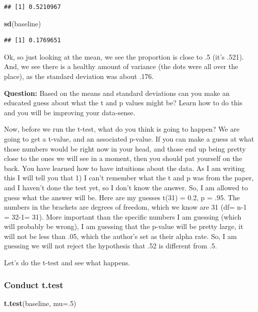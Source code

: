 \documentclass[]{book}
\newenvironment{Shaded}{\begin{snugshade}}{\end{snugshade}}
\newcommand{\KeywordTok}[1]{\textcolor[rgb]{0.13,0.29,0.53}{\textbf{{#1}}}}
\newcommand{\DataTypeTok}[1]{\textcolor[rgb]{0.13,0.29,0.53}{{#1}}}
\newcommand{\DecValTok}[1]{\textcolor[rgb]{0.00,0.00,0.81}{{#1}}}
\newcommand{\NormalTok}[1]{{#1}}
\theoremstyle{definition}
\theoremstyle{definition}
\theoremstyle{definition}
\theoremstyle{remark}
\begin{document}
\begin{verbatim}
## [1] 0.5210967
\end{verbatim}

\begin{Shaded}
\begin{Highlighting}[]
\KeywordTok{sd}\NormalTok{(baseline)}
\end{Highlighting}
\end{Shaded}

\begin{verbatim}
## [1] 0.1769651
\end{verbatim}

Ok, so just looking at the mean, we see the proportion is close to .5
(it's .521). And, we see there is a healthy amount of variance (the dots
were all over the place), as the standard deviation was about .176.

\textbf{Question:} Based on the means and standard deviations can you
make an educated guess about what the t and p values might be? Learn how
to do this and you will be improving your data-sense.

Now, before we run the t-test, what do you think is going to happen? We
are going to get a t-value, and an associated p-value. If you can make a
guess at what those numbers would be right now in your head, and those
end up being pretty close to the ones we will see in a moment, then you
should pat yourself on the back. You have learned how to have intuitions
about the data. As I am writing this I will tell you that 1) I can't
remember what the t and p was from the paper, and I haven't done the
test yet, so I don't know the answer. So, I am allowed to guess what the
answer will be. Here are my guesses t(31) = 0.2, p = .95. The numbers in
the brackets are degrees of freedom, which we know are 31 (df= n-1 =
32-1= 31). More important than the specific numbers I am guessing (which
will probably be wrong), I am guessing that the p-value will be pretty
large, it will not be less than .05, which the author's set as their
alpha rate. So, I am guessing we will not reject the hypothesis that .52
is different from .5.

Let's do the t-test and see what happens.

\subsubsection{Conduct t.test}\label{conduct-t.test}

\begin{Shaded}
\begin{Highlighting}[]
\KeywordTok{t.test}\NormalTok{(baseline, }\DataTypeTok{mu=}\NormalTok{.}\DecValTok{5}\NormalTok{)}
\end{Highlighting}
\end{Shaded}
\end{document}

